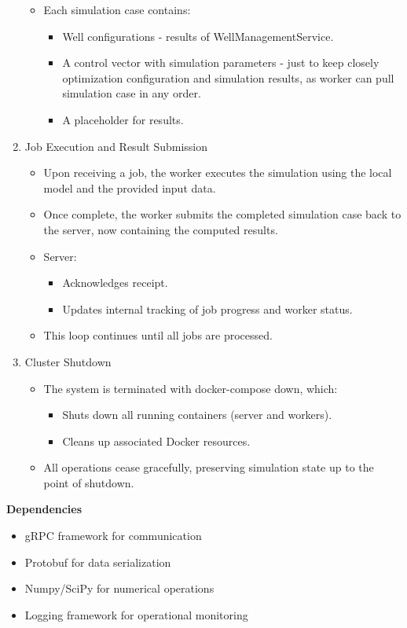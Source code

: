 \begin{enumerate}
\begin{itemize}
\begin{itemize}
		\end{itemize}
		\item Each simulation case contains:
		\begin{itemize}
			\item Well configurations - results of WellManagementService.
			\item A control vector with simulation parameters - just to keep closely optimization configuration and simulation results, as worker can pull simulation case in any order.
			\item A placeholder for results.
		\end{itemize}
	\end{itemize}
	\item Job Execution and Result Submission
	\begin{itemize}
		\item Upon receiving a job, the worker executes the simulation using the local model and the provided input data.
		\item Once complete, the worker submits the completed simulation case back to the server, now containing the computed results.
		\item Server:
		\begin{itemize}
			\item Acknowledges receipt.
			\item Updates internal tracking of job progress and worker status.
		\end{itemize}
		\item This loop continues until all jobs are processed.
	\end{itemize}
	\item Cluster Shutdown
	\begin{itemize}
		\item The system is terminated with docker-compose down, which:
		\begin{itemize}
			\item Shuts down all running containers (server and workers).
			\item Cleans up associated Docker resources.
		\end{itemize}
		\item All operations cease gracefully, preserving simulation state up to the point of shutdown.
	\end{itemize}
\end{enumerate}

\bigskip
\textbf{Dependencies}

\begin{itemize}
	\item gRPC framework for communication
	\item Protobuf for data serialization
	\item Numpy/SciPy for numerical operations
	\item Logging framework for operational monitoring
\end{itemize}
